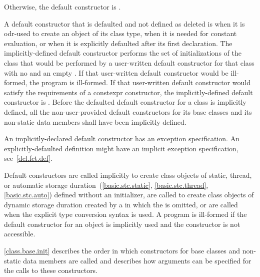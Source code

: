Otherwise, the default constructor is
.

\pnum
A default constructor
that is defaulted and not defined as deleted
is
when it is odr-used
to create an object of its class type,
when it is needed for constant evaluation, or
when it is explicitly defaulted after its first declaration.
The implicitly-defined default constructor performs the set of
initializations of the class that would be performed by a user-written default
constructor for that class with no
 and an empty
.
If that user-written default constructor would be ill-formed,
the program is ill-formed.
If that user-written default constructor would satisfy the requirements
of a constexpr constructor, the implicitly-defined
default constructor is .
Before the defaulted default constructor for a class is
implicitly defined,
all the non-user-provided default constructors for its base classes and
its non-static data members shall have been implicitly defined.
\begin{note}
An implicitly-declared default constructor has an
exception specification.
An explicitly-defaulted definition might have an
implicit exception specification, see~\ref{dcl.fct.def}.
\end{note}

\pnum
{}%
Default constructors are called implicitly to create class objects of static, thread,
or automatic storage duration~(\ref{basic.stc.static}, \ref{basic.stc.thread}, \ref{basic.stc.auto}) defined
without an initializer,
are called to create class objects of dynamic storage duration created by a
in which the
is omitted, or
are called when the explicit type conversion syntax is
used.
A program is ill-formed if the default constructor for an object
is implicitly used and the constructor is not accessible.

\pnum
\begin{note}
%
%
\ref{class.base.init} describes the order in which constructors for base
classes and non-static data members are called and
describes how arguments can be specified for the calls to these constructors.
\end{note}

